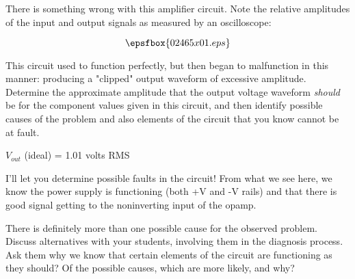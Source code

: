 

There is something wrong with this amplifier circuit.  Note the relative amplitudes of the input and output signals as measured by an oscilloscope:

$$\epsfbox{02465x01.eps}$$

This circuit used to function perfectly, but then began to malfunction in this manner: producing a "clipped" output waveform of excessive amplitude.  Determine the approximate amplitude that the output voltage waveform {\it should} be for the component values given in this circuit, and then identify possible causes of the problem and also elements of the circuit that you know cannot be at fault.







$V_{out}$ (ideal) = 1.01 volts RMS

\vskip 10pt

I'll let you determine possible faults in the circuit!  From what we see here, we know the power supply is functioning (both +V and -V rails) and that there is good signal getting to the noninverting input of the opamp.







There is definitely more than one possible cause for the observed problem.  Discuss alternatives with your students, involving them in the diagnosis process.  Ask them why we know that certain elements of the circuit are functioning as they should?  Of the possible causes, which are more likely, and why?




